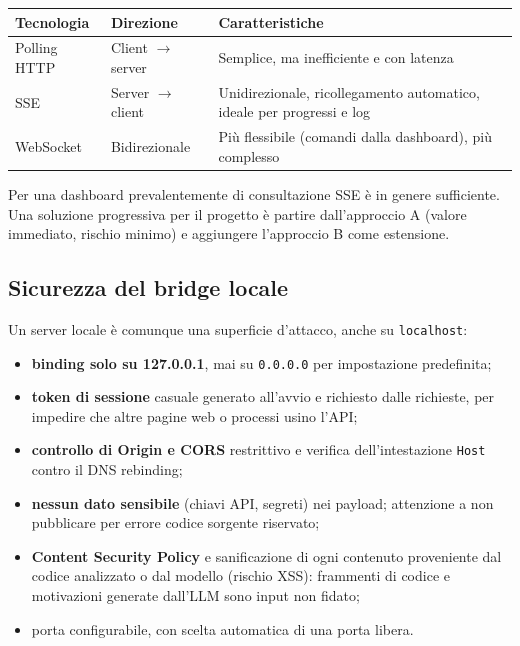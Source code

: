 \documentclass[a4paper, 11pt]{article}
\begin{document}
\vspace{0.3cm}
\noindent
\begin{tabularx}{\textwidth}{|l|l|X|}
    \hline
    \textbf{Tecnologia} & \textbf{Direzione} & \textbf{Caratteristiche} \\ \hline
    Polling HTTP & Client $\to$ server & Semplice, ma inefficiente e con latenza \\ \hline
    SSE & Server $\to$ client & Unidirezionale, ricollegamento automatico, ideale per progressi e log \\ \hline
    WebSocket & Bidirezionale & Più flessibile (comandi dalla dashboard), più complesso \\ \hline
\end{tabularx}
\vspace{0.3cm}

Per una dashboard prevalentemente di consultazione SSE è in genere sufficiente. Una soluzione progressiva per il progetto è partire dall'approccio A (valore immediato, rischio minimo) e aggiungere l'approccio B come estensione.

\subsection{Sicurezza del bridge locale}
Un server locale è comunque una superficie d'attacco, anche su \texttt{localhost}:
\begin{itemize}[noitemsep]
    \item \textbf{binding solo su 127.0.0.1}, mai su \texttt{0.0.0.0} per impostazione predefinita;
    \item \textbf{token di sessione} casuale generato all'avvio e richiesto dalle richieste, per impedire che altre pagine web o processi usino l'API;
    \item \textbf{controllo di Origin e CORS} restrittivo e verifica dell'intestazione \texttt{Host} contro il DNS rebinding;
    \item \textbf{nessun dato sensibile} (chiavi API, segreti) nei payload; attenzione a non pubblicare per errore codice sorgente riservato;
    \item \textbf{Content Security Policy} e sanificazione di ogni contenuto proveniente dal codice analizzato o dal modello (rischio XSS): frammenti di codice e motivazioni generate dall'LLM sono input non fidato;
    \item porta configurabile, con scelta automatica di una porta libera.
\end{itemize}
\end{document}

